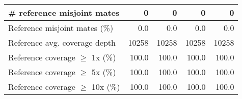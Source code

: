 \documentclass[12pt,a4paper]{article}
\begin{document}
\begin{table}[ht]
\begin{center}
\begin{tabular}{|l*{4}{|r}|}
\# reference misjoint mates & 0 & 0 & 0 & 0 \\ \hline
Reference misjoint mates (\%) & 0.0 & 0.0 & 0.0 & 0.0 \\ \hline
Reference avg. coverage depth & 10258 & 10258 & 10258 & 10258 \\ \hline
Reference coverage $\geq$ 1x (\%) & 100.0 & 100.0 & 100.0 & 100.0 \\ \hline
Reference coverage $\geq$ 5x (\%) & 100.0 & 100.0 & 100.0 & 100.0 \\ \hline
Reference coverage $\geq$ 10x (\%) & 100.0 & 100.0 & 100.0 & 100.0 \\ \hline
\end{tabular}
\end{center}
\end{table}
\end{document}
